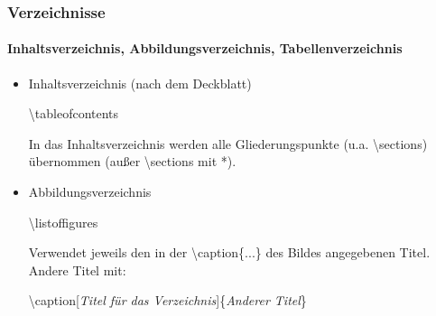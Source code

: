
\begin{frame}
\frametitle{Verzeichnisse}
\framesubtitle{Inhaltsverzeichnis, Abbildungsverzeichnis, Tabellenverzeichnis}
\begin{itemize}


\item Inhaltsverzeichnis (nach dem Deckblatt)\\
\medskip
\begin{ttfamily}{\normalsize
\color{nounibaredI}\textbackslash tableofcontents\\}
\end{ttfamily}
\medskip
In das Inhaltsverzeichnis werden alle Gliederungspunkte (u.a. \color{unibablueI} \textbackslash section\color{black}s) übernommen (außer \color{unibablueI} \textbackslash section\color{black}s mit *).\\
\medskip

\item Abbildungsverzeichnis\\
\medskip
\begin{ttfamily}{\normalsize
\color{nounibaredI}\textbackslash listoffigures\\}
\end{ttfamily}
\medskip
Verwendet jeweils den in der {\ttfamily \color{nounibaredI}\textbackslash caption\color{black}\{...\}} des Bildes angegebenen Titel. 
Andere Titel mit:\\ 
\begin{ttfamily}{\normalsize
\color{nounibaredI} \textbackslash caption\color{nounibagreenI}[\textit{Titel für das Verzeichnis}]\color{black}\{\textit{Anderer Titel}\}\\}
\end{ttfamily}
\medskip


\end{itemize}
\end{frame}

